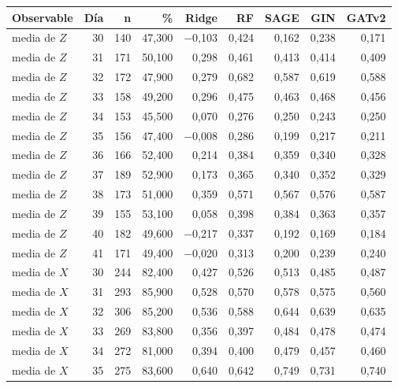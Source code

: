 \begin{table}[htbp]
    \centering
    {\footnotesize
    \begin{tabular}{@{}lrrrrrrrr@{}}
        \toprule
        \textbf{Observable} & \textbf{Día} & \textbf{n} & \textbf{\%} & \textbf{Ridge} & \textbf{RF} & \textbf{SAGE} & \textbf{GIN} & \textbf{GATv2} \\
        \midrule
        media de $Z$ & 30 & 140 & 47,300 & $-$0,103 & 0,424 & 0,162 & 0,238 & 0,171 \\
        media de $Z$ & 31 & 171 & 50,100 & 0,298 & 0,461 & 0,413 & 0,414 & 0,409 \\
        media de $Z$ & 32 & 172 & 47,900 & 0,279 & 0,682 & 0,587 & 0,619 & 0,588 \\
        media de $Z$ & 33 & 158 & 49,200 & 0,296 & 0,475 & 0,463 & 0,468 & 0,456 \\
        media de $Z$ & 34 & 153 & 45,500 & 0,070 & 0,276 & 0,250 & 0,243 & 0,250 \\
        media de $Z$ & 35 & 156 & 47,400 & $-$0,008 & 0,286 & 0,199 & 0,217 & 0,211 \\
        media de $Z$ & 36 & 166 & 52,400 & 0,214 & 0,384 & 0,359 & 0,340 & 0,328 \\
        media de $Z$ & 37 & 189 & 52,900 & 0,173 & 0,365 & 0,340 & 0,352 & 0,329 \\
        media de $Z$ & 38 & 173 & 51,000 & 0,359 & 0,571 & 0,567 & 0,576 & 0,587 \\
        media de $Z$ & 39 & 155 & 53,100 & 0,058 & 0,398 & 0,384 & 0,363 & 0,357 \\
        media de $Z$ & 40 & 182 & 49,600 & $-$0,217 & 0,337 & 0,192 & 0,169 & 0,184 \\
        media de $Z$ & 41 & 171 & 49,400 & $-$0,020 & 0,313 & 0,200 & 0,239 & 0,240 \\
        media de $X$ & 30 & 244 & 82,400 & 0,427 & 0,526 & 0,513 & 0,485 & 0,487 \\
        media de $X$ & 31 & 293 & 85,900 & 0,528 & 0,570 & 0,578 & 0,575 & 0,560 \\
        media de $X$ & 32 & 306 & 85,200 & 0,536 & 0,588 & 0,644 & 0,639 & 0,635 \\
        media de $X$ & 33 & 269 & 83,800 & 0,356 & 0,397 & 0,484 & 0,478 & 0,474 \\
        media de $X$ & 34 & 272 & 81,000 & 0,394 & 0,400 & 0,479 & 0,457 & 0,460 \\
        media de $X$ & 35 & 275 & 83,600 & 0,640 & 0,642 & 0,749 & 0,731 & 0,740 \\

\end{tabular}}
\end{table}
